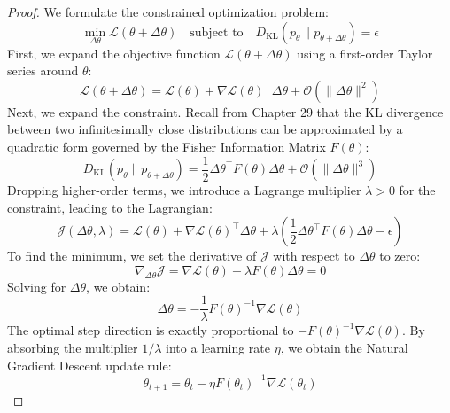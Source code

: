 \begin{proof}
We formulate the constrained optimization problem:
\begin{equation}
    \min_{\Delta \theta} \mathcal{L}(\theta + \Delta \theta) \quad \text{subject to} \quad D_{\mathrm{KL}}(p_\theta \parallel p_{\theta+\Delta\theta}) = \epsilon
\end{equation}
First, we expand the objective function $\mathcal{L}(\theta + \Delta \theta)$ using a first-order Taylor series around $\theta$:
\begin{equation}
    \mathcal{L}(\theta + \Delta \theta) = \mathcal{L}(\theta) + \nabla \mathcal{L}(\theta)^\top \Delta \theta + \mathcal{O}(\|\Delta \theta\|^2)
\end{equation}
Next, we expand the constraint. Recall from Chapter 29 that the KL divergence between two infinitesimally close distributions can be approximated by a quadratic form governed by the Fisher Information Matrix $F(\theta)$:
\begin{equation}
    D_{\mathrm{KL}}(p_\theta \parallel p_{\theta+\Delta\theta}) = \frac{1}{2} \Delta \theta^\top F(\theta) \Delta \theta + \mathcal{O}(\|\Delta \theta\|^3)
\end{equation}
Dropping higher-order terms, we introduce a Lagrange multiplier $\lambda > 0$ for the constraint, leading to the Lagrangian:
\begin{equation}
    \mathcal{J}(\Delta \theta, \lambda) = \mathcal{L}(\theta) + \nabla \mathcal{L}(\theta)^\top \Delta \theta + \lambda \left( \frac{1}{2} \Delta \theta^\top F(\theta) \Delta \theta - \epsilon \right)
\end{equation}
To find the minimum, we set the derivative of $\mathcal{J}$ with respect to $\Delta \theta$ to zero:
\begin{equation}
    \nabla_{\Delta \theta} \mathcal{J} = \nabla \mathcal{L}(\theta) + \lambda F(\theta) \Delta \theta = 0
\end{equation}
Solving for $\Delta \theta$, we obtain:
\begin{equation}
    \Delta \theta = -\frac{1}{\lambda} F(\theta)^{-1} \nabla \mathcal{L}(\theta)
\end{equation}
The optimal step direction is exactly proportional to $-F(\theta)^{-1} \nabla \mathcal{L}(\theta)$. By absorbing the multiplier $1/\lambda$ into a learning rate $\eta$, we obtain the Natural Gradient Descent update rule:
\begin{equation}
    \theta_{t+1} = \theta_t - \eta F(\theta_t)^{-1} \nabla \mathcal{L}(\theta_t)
\end{equation}
\end{proof}

